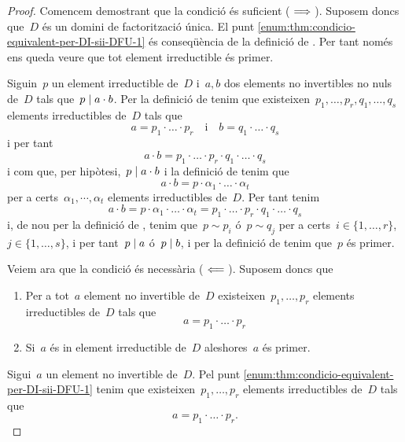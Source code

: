\documentclass[../../main.tex]{subfiles}
\begin{document}
    \begin{proof}
        Comencem demostrant que la condició és suficient (\(\implies\)).
        Suposem doncs que~\(D\) és un domini de factorització única.
        El punt \eqref{enum:thm:condicio-equivalent-per-DI-sii-DFU-1} és conseqüència de la definició de .
        Per tant només ens queda veure que tot element irreductible és primer.

        Siguin~\(p\) un element irreductible de~\(D\) i~\(a,b\) dos elements no invertibles no nuls de~\(D\) tals que~\(p\mathrel{|} a\cdot b\).
        Per la definició de  tenim que existeixen~\(p_{1},\dots,p_{r},q_{1},\dots,q_{s}\) elements irreductibles de~\(D\) tals que
        \[
            a=p_{1}\cdot\ldots\cdot p_{r}\quad\text{i}\quad b=q_{1}\cdot\ldots\cdot q_{s}
        \]
        i per tant
        \[
            a\cdot b=p_{1}\cdot\ldots\cdot p_{r}\cdot q_{1}\cdot\ldots\cdot q_{s}
        \]
        i com que, per hipòtesi,~\(p\mathrel{|} a\cdot b\) i la definició de  tenim que
        \[
            a\cdot b=p\cdot\alpha_{1}\cdot\ldots\cdot\alpha_{t}
        \]
        per a certs~\(\alpha_{1},\cdots,\alpha_{t}\) elements irreductibles de~\(D\).
        Per tant tenim
        \[
            a\cdot b=p\cdot\alpha_{1}\cdot\ldots\cdot\alpha_{t}=p_{1}\cdot\ldots\cdot p_{r}\cdot q_{1}\cdot\ldots\cdot q_{s}
        \]
        i, de nou per la definició de , tenim que~\(p\sim p_{i}\) ó~\(p\sim q_{j}\) per a certs~\(i\in\{1,\dots,r\}\),~\(j\in\{1,\dots,s\}\), i per tant~\(p\mathrel{|} a\) ó~\(p\mathrel{|} b\), i per la definició de  tenim que~\(p\) és primer.

        Veiem ara que la condició és necessària (\(\impliedby\)).
        Suposem doncs que
        \begin{enumerate}
            \item Per a tot~\(a\) element no invertible de~\(D\) existeixen~\(p_{1},\dots,p_{r}\) elements irreductibles de~\(D\) tals que
            \[
                a=p_{1}\cdot\ldots\cdot p_{r}
            \]
            \item Si~\(a\) és in element irreductible de~\(D\) aleshores~\(a\) és primer.
        \end{enumerate}
        Sigui~\(a\) un element no invertible de~\(D\).
        Pel punt \eqref{enum:thm:condicio-equivalent-per-DI-sii-DFU-1} tenim que existeixen~\(p_{1},\dots,p_{r}\) elements irreductibles de~\(D\) tals que
        \[
            a=p_{1}\cdot\ldots\cdot p_{r}.
        \]


\end{proof}
\end{document}
